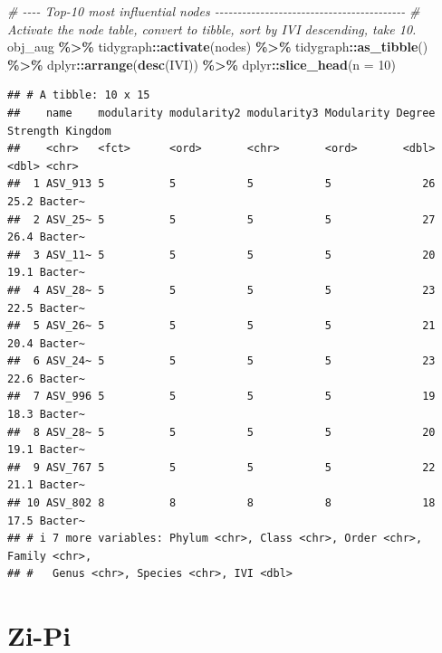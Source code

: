 \documentclass[
]{book}
\newenvironment{Shaded}{\begin{snugshade}}{\end{snugshade}}
\newcommand{\AttributeTok}[1]{\textcolor[rgb]{0.13,0.29,0.53}{#1}}
\newcommand{\CommentTok}[1]{\textcolor[rgb]{0.56,0.35,0.01}{\textit{#1}}}
\newcommand{\DecValTok}[1]{\textcolor[rgb]{0.00,0.00,0.81}{#1}}
\newcommand{\FunctionTok}[1]{\textcolor[rgb]{0.13,0.29,0.53}{\textbf{#1}}}
\newcommand{\NormalTok}[1]{#1}
\newcommand{\SpecialCharTok}[1]{\textcolor[rgb]{0.81,0.36,0.00}{\textbf{#1}}}
\begin{document}
\begin{Shaded}
\begin{Highlighting}[]
\CommentTok{\# {-}{-}{-}{-} Top{-}10 most influential nodes {-}{-}{-}{-}{-}{-}{-}{-}{-}{-}{-}{-}{-}{-}{-}{-}{-}{-}{-}{-}{-}{-}{-}{-}{-}{-}{-}{-}{-}{-}{-}{-}{-}{-}{-}{-}{-}{-}{-}{-}{-}{-}}
\CommentTok{\# Activate the node table, convert to tibble, sort by IVI descending, take 10.}
\NormalTok{obj\_aug }\SpecialCharTok{\%\textgreater{}\%}
\NormalTok{  tidygraph}\SpecialCharTok{::}\FunctionTok{activate}\NormalTok{(nodes) }\SpecialCharTok{\%\textgreater{}\%}
\NormalTok{  tidygraph}\SpecialCharTok{::}\FunctionTok{as\_tibble}\NormalTok{() }\SpecialCharTok{\%\textgreater{}\%}
\NormalTok{  dplyr}\SpecialCharTok{::}\FunctionTok{arrange}\NormalTok{(}\FunctionTok{desc}\NormalTok{(IVI)) }\SpecialCharTok{\%\textgreater{}\%}
\NormalTok{  dplyr}\SpecialCharTok{::}\FunctionTok{slice\_head}\NormalTok{(}\AttributeTok{n =} \DecValTok{10}\NormalTok{)}
\end{Highlighting}
\end{Shaded}

\begin{verbatim}
## # A tibble: 10 x 15
##    name    modularity modularity2 modularity3 Modularity Degree Strength Kingdom
##    <chr>   <fct>      <ord>       <chr>       <ord>       <dbl>    <dbl> <chr>  
##  1 ASV_913 5          5           5           5              26     25.2 Bacter~
##  2 ASV_25~ 5          5           5           5              27     26.4 Bacter~
##  3 ASV_11~ 5          5           5           5              20     19.1 Bacter~
##  4 ASV_28~ 5          5           5           5              23     22.5 Bacter~
##  5 ASV_26~ 5          5           5           5              21     20.4 Bacter~
##  6 ASV_24~ 5          5           5           5              23     22.6 Bacter~
##  7 ASV_996 5          5           5           5              19     18.3 Bacter~
##  8 ASV_28~ 5          5           5           5              20     19.1 Bacter~
##  9 ASV_767 5          5           5           5              22     21.1 Bacter~
## 10 ASV_802 8          8           8           8              18     17.5 Bacter~
## # i 7 more variables: Phylum <chr>, Class <chr>, Order <chr>, Family <chr>,
## #   Genus <chr>, Species <chr>, IVI <dbl>
\end{verbatim}

\chapter{Zi-Pi}\label{zi-pi}
\end{document}

